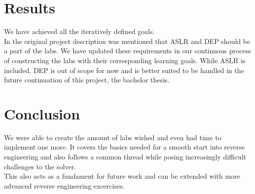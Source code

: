 \section{Results}
We have achieved all the iteratively defined goals. \\
In the original project description was mentioned that ASLR and DEP should be a  part of the labs. We have updated these requirements in our continuous process of constructing the labs with their corresponding learning goals. While ASLR is included, DEP is out of scope for now and is better suited to be handled in the future continuation of this project, the bachelor thesis.

\section{Conclusion}
We were able to create the amount of labs wished and even had time to implement one more. It covers the basics needed for a smooth start into reverse engineering and also follows a common thread while posing increasingly difficult challenges to the solver. \\
This also acts as a fundament for future work and can be extended with more advanced reverse engineering excercises. 
